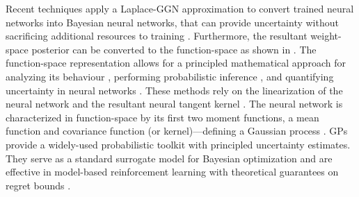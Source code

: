 \documentclass{article}
\makeatletter
\newcommand{\eg}{\textit{e.g.\@}\xspace}
\makeatother
\begin{document}
Recent techniques  \citep[\eg,][]{ritter2018kfac,khan2019approximate,daxberger2021laplace,fortuin2021bayesian,immer2021scalable} apply a Laplace-GGN approximation to convert trained neural networks into Bayesian neural networks, that can provide uncertainty without sacrificing additional resources to training \citep{foong2019between}. Furthermore, the resultant weight-space posterior can be converted to the function-space as shown in \citet{khan2019approximate, immer2021improving}. The function-space representation allows for a principled mathematical approach for analyzing its behaviour \citep{cho2009kernel,meronen2020stationary}, performing probabilistic inference \citep{khan2019approximate}, and quantifying uncertainty in neural networks \citep{foong2019between}. These methods rely on the linearization of the neural network and the resultant neural tangent kernel \citep[NTK,][]{jacot2018neural}. The neural network is characterized in function-space by its first two moment functions, a mean function and covariance function (or kernel)---defining a Gaussian process \citep[GP,][]{rasmussen2006gaussian}. GPs provide a widely-used probabilistic toolkit with principled uncertainty estimates. They serve as a standard surrogate model for Bayesian optimization \citep{garnett_bayesoptbook_2022} and are effective in model-based reinforcement learning \citep{deisenroth2011pilco} with theoretical guarantees on regret bounds \citep{srinivas2009gaussian}.
\end{document}
